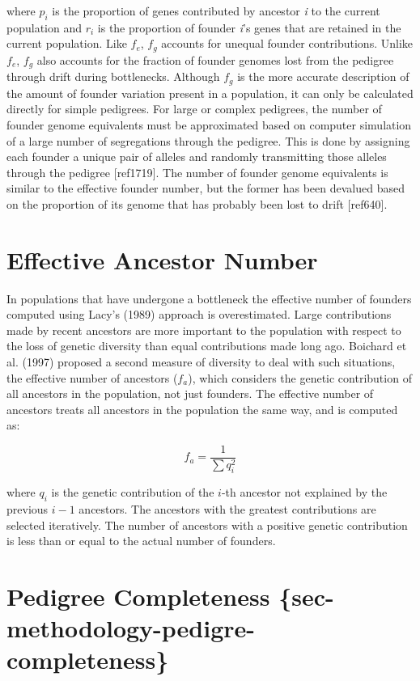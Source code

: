 \documentclass[
  letterpaper,
  DIV=11,
  numbers=noendperiod]{scrreprt}
\begin{document}
where \(p_i\) is the proportion of genes contributed by ancestor
\textit{i} to the current population and \(r_i\) is the proportion of
founder \textit{i}'s genes that are retained in the current population.
Like \(f_e\), \(f_g\) accounts for unequal founder contributions. Unlike
\(f_e\), \(f_g\) also accounts for the fraction of founder genomes lost
from the pedigree through drift during bottlenecks. Although \(f_g\) is
the more accurate description of the amount of founder variation present
in a population, it can only be calculated directly for simple
pedigrees. For large or complex pedigrees, the number of founder genome
equivalents must be approximated based on computer simulation of a large
number of segregations through the pedigree. This is done by assigning
each founder a unique pair of alleles and randomly transmitting those
alleles through the pedigree {[}ref1719{]}. The number of founder genome
equivalents is similar to the effective founder number, but the former
has been devalued based on the proportion of its genome that has
probably been lost to drift {[}ref640{]}.

\section{Effective Ancestor
Number}\label{sec-methodology-computation-effective-ancestor-number}

In populations that have undergone a bottleneck the effective number of
founders computed using Lacy's (1989) approach is overestimated. Large
contributions made by recent ancestors are more important to the
population with respect to the loss of genetic diversity than equal
contributions made long ago. Boichard et al. (1997) proposed a second
measure of diversity to deal with such situations, the effective number
of ancestors (\(f_a\)), which considers the genetic contribution of all
ancestors in the population, not just founders. The effective number of
ancestors treats all ancestors in the population the same way, and is
computed as:

\[ f_a = \dfrac{1}{\sum{q_i^2}} \]

where \(q_i\) is the genetic contribution of the \(i\)-th ancestor not
explained by the previous \(i-1\) ancestors. The ancestors with the
greatest contributions are selected iteratively. The number of ancestors
with a positive genetic contribution is less than or equal to the actual
number of founders.

\section{Pedigree Completeness
\{sec-methodology-pedigre-completeness\}}\label{pedigree-completeness-sec-methodology-pedigre-completeness}
\end{document}
